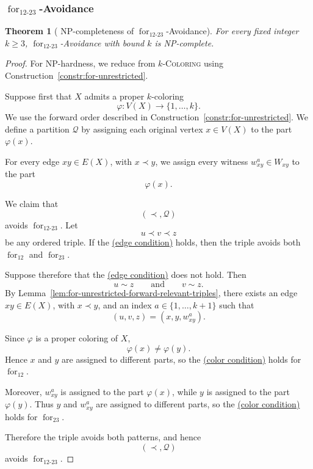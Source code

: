 \documentclass[12pt]{article}
\theoremstyle{plain}
\newtheorem{theorem}{Theorem}[section]
\theoremstyle{definition}
\theoremstyle{remark}
\theoremstyle{definition}
\newcommand{\edgecondition}{%
  \hyperref[def:avoid:cond:edge]{(edge condition)}\xspace
}
\newcommand{\colorcondition}{%
  \hyperref[def:avoid:cond:color]{(color condition)}\xspace
}
\newcommand{\forlabel}{\mathrm{for}}
\DeclareRobustCommand{\forparam}[1]{%
  \ensuremath{\mathop{\forlabel}\nolimits_{#1}}%
}
\begin{document}
\subsubsection{
\texorpdfstring{\(\forparam{12\text{-}23}\)-Avoidance}
{for12-23-Avoidance}
}
\label{subsubsec:for12-23-avoidance}



\begin{theorem}[
NP-completeness of
\texorpdfstring{\(\forparam{12\text{-}23}\)-Avoidance}
{for12-23-Avoidance}
]
\label{thm:for12-23-np-complete}
For every fixed integer \(k\ge 3\),
\(\forparam{12\text{-}23}\)-Avoidance with bound \(k\) is NP-complete.
\end{theorem}

\begin{proof}
For NP-hardness, we reduce from \(k\)-\textsc{Coloring} using
Construction~\ref{constr:for-unrestricted}.

Suppose first that \(X\) admits a proper \(k\)-coloring
\[
\varphi:V(X)\to\{1,\dots,k\}.
\]
We use the forward order described in
Construction~\ref{constr:for-unrestricted}. We define a partition
\(\mathcal Q\) by assigning each original vertex \(x\in V(X)\) to the
part \(\varphi(x)\).

For every edge \(xy\in E(X)\), with \(x\prec y\), we assign every
witness \(w^a_{xy}\in W_{xy}\) to the part
\[
\varphi(x).
\]

We claim that
\[
(\prec,\mathcal Q)
\]
avoids \(\forparam{12\text{-}23}\). Let
\[
u\prec v\prec z
\]
be any ordered triple. If the \edgecondition{} holds, then the triple
avoids both \(\forparam{12}\) and \(\forparam{23}\).

Suppose therefore that the \edgecondition{} does not hold. Then
\[
u\sim z
\qquad\text{and}\qquad
v\sim z.
\]
By Lemma~\ref{lem:for-unrestricted-forward-relevant-triples}, there
exists an edge \(xy\in E(X)\), with \(x\prec y\), and an index
\(a\in\{1,\dots,k+1\}\) such that
\[
(u,v,z)=(x,y,w^a_{xy}).
\]

Since \(\varphi\) is a proper coloring of \(X\),
\[
\varphi(x)\neq\varphi(y).
\]
Hence \(x\) and \(y\) are assigned to different parts, so the
\colorcondition{} holds for \(\forparam{12}\).

Moreover, \(w^a_{xy}\) is assigned to the part \(\varphi(x)\), while
\(y\) is assigned to the part \(\varphi(y)\). Thus \(y\) and
\(w^a_{xy}\) are assigned to different parts, so the
\colorcondition{} holds for \(\forparam{23}\).

Therefore the triple avoids both patterns, and hence
\[
(\prec,\mathcal Q)
\]
avoids \(\forparam{12\text{-}23}\).


\end{proof}
\end{document}
